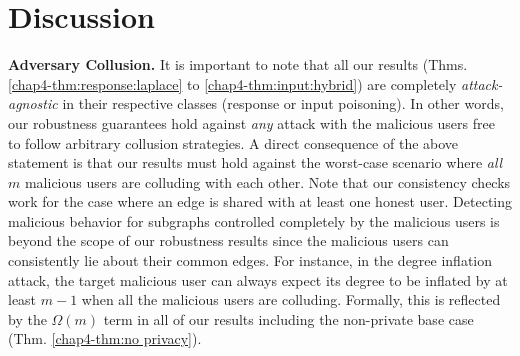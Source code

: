 \section{Discussion}\label{chap4-sec:discussion}
\noindent\textbf{Adversary Collusion.} It is important to note that all our results (Thms. \ref{chap4-thm:response:laplace} to \ref{chap4-thm:input:hybrid}) are completely \textit{attack-agnostic} in their respective classes (response or input poisoning). In other words, our robustness guarantees hold against \textit{any} attack with the malicious users free to follow arbitrary collusion strategies. A direct consequence of the above statement is that our results must hold against the worst-case scenario  where \textit{all} $m$ malicious users are colluding with each other. Note that our consistency checks work for the case where an edge is shared with at least one honest user. Detecting malicious behavior for subgraphs controlled completely by the malicious users is beyond the scope of our robustness results since the malicious users can consistently lie about their common edges. For instance, in the degree inflation attack, the target malicious user can always expect its degree to be inflated by at least $m-1$ when all the malicious users are colluding. Formally, this is reflected by the $\Omega(m)$ term in all of our results including the non-private base case (Thm. \ref{chap4-thm:no privacy}).  

